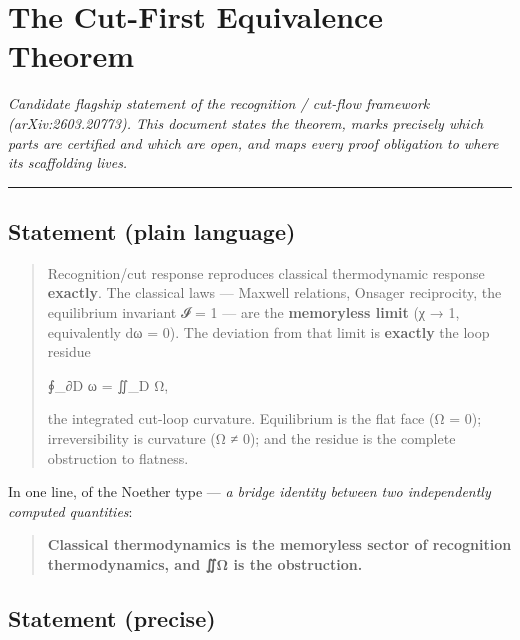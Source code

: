 \hypertarget{the-cut-first-equivalence-theorem}{%
\chapter{The Cut-First Equivalence Theorem}\label{the-cut-first-equivalence-theorem}}

\emph{Candidate flagship statement of the recognition / cut-flow framework
(arXiv:2603.20773). This document states the theorem, marks precisely
which parts are certified and which are open, and maps every proof
obligation to where its scaffolding lives.}

\begin{center}\rule{0.5\linewidth}{0.5pt}\end{center}

\hypertarget{statement-plain-language}{%
\section{Statement (plain language)}\label{statement-plain-language}}

\begin{quote}
Recognition/cut response reproduces classical thermodynamic response
\textbf{exactly}. The classical laws --- Maxwell relations, Onsager
reciprocity, the equilibrium invariant 𝓘 = 1 --- are the \textbf{memoryless
limit} (χ → 1, equivalently dω = 0). The deviation from that limit is
\textbf{exactly} the loop residue

∮\_∂D ω = ∬\_D Ω,

the integrated cut-loop curvature. Equilibrium is the flat face
(Ω = 0); irreversibility is curvature (Ω ≠ 0); and the residue is the
complete obstruction to flatness.
\end{quote}

In one line, of the Noether type --- \emph{a bridge identity between two
independently computed quantities}:

\begin{quote}
\textbf{Classical thermodynamics is the memoryless sector of recognition
thermodynamics, and ∬Ω is the obstruction.}
\end{quote}

\hypertarget{statement-precise}{%
\section{Statement (precise)}\label{statement-precise}}

